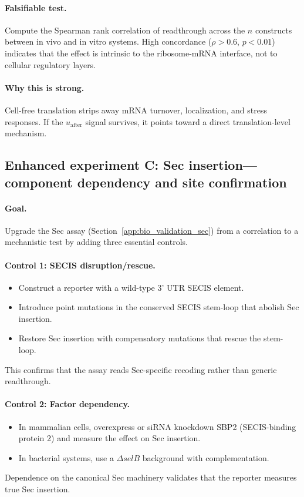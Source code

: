 \paragraph{Falsifiable test.}
Compute the Spearman rank correlation of readthrough across the $n$ constructs between in vivo and in vitro systems.
High concordance ($\rho > 0.6$, $p < 0.01$) indicates that the effect is intrinsic to the ribosome-mRNA interface, not to cellular regulatory layers.

\paragraph{Why this is strong.}
Cell-free translation strips away mRNA turnover, localization, and stress responses.
If the $u_{\mathrm{after}}$ signal survives, it points toward a direct translation-level mechanism.

\subsection{Enhanced experiment C: Sec insertion---component dependency and site confirmation}
\label{app:bio_exp_c_sec_mechanistic}

\paragraph{Goal.}
Upgrade the Sec assay (Section~\ref{app:bio_validation_sec}) from a correlation to a mechanistic test by adding three essential controls.

\paragraph{Control 1: SECIS disruption/rescue.}
\begin{itemize}
\item Construct a reporter with a wild-type 3' UTR SECIS element.
\item Introduce point mutations in the conserved SECIS stem-loop that abolish Sec insertion.
\item Restore Sec insertion with compensatory mutations that rescue the stem-loop.
\end{itemize}
This confirms that the assay reads Sec-specific recoding rather than generic readthrough.

\paragraph{Control 2: Factor dependency.}
\begin{itemize}
\item In mammalian cells, overexpress or siRNA knockdown SBP2 (SECIS-binding protein 2) and measure the effect on Sec insertion.
\item In bacterial systems, use a $\Delta\textit{selB}$ background with complementation.
\end{itemize}
Dependence on the canonical Sec machinery validates that the reporter measures true Sec insertion.

